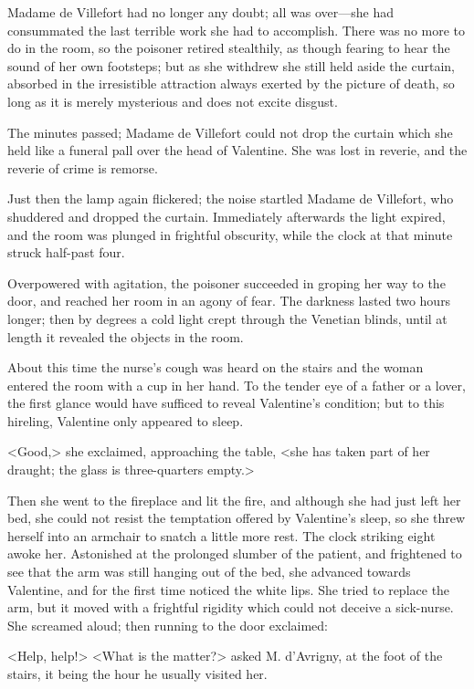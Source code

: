  Madame de Villefort had no longer any doubt; all was over—she had consummated the last terrible work she had to accomplish. There was no more to do in the room, so the poisoner retired stealthily, as though fearing to hear the sound of her own footsteps; but as she withdrew she still held aside the curtain, absorbed in the irresistible attraction always exerted by the picture of death, so long as it is merely mysterious and does not excite disgust. 

 The minutes passed; Madame de Villefort could not drop the curtain which she held like a funeral pall over the head of Valentine. She was lost in reverie, and the reverie of crime is remorse. 

 Just then the lamp again flickered; the noise startled Madame de Villefort, who shuddered and dropped the curtain. Immediately afterwards the light expired, and the room was plunged in frightful obscurity, while the clock at that minute struck half-past four. 

 Overpowered with agitation, the poisoner succeeded in groping her way to the door, and reached her room in an agony of fear. The darkness lasted two hours longer; then by degrees a cold light crept through the Venetian blinds, until at length it revealed the objects in the room. 

 About this time the nurse's cough was heard on the stairs and the woman entered the room with a cup in her hand. To the tender eye of a father or a lover, the first glance would have sufficed to reveal Valentine's condition; but to this hireling, Valentine only appeared to sleep. 

 <Good,> she exclaimed, approaching the table, <she has taken part of her draught; the glass is three-quarters empty.> 

 Then she went to the fireplace and lit the fire, and although she had just left her bed, she could not resist the temptation offered by Valentine's sleep, so she threw herself into an armchair to snatch a little more rest. The clock striking eight awoke her. Astonished at the prolonged slumber of the patient, and frightened to see that the arm was still hanging out of the bed, she advanced towards Valentine, and for the first time noticed the white lips. She tried to replace the arm, but it moved with a frightful rigidity which could not deceive a sick-nurse. She screamed aloud; then running to the door exclaimed: 

 <Help, help!>  <What is the matter?> asked M. d'Avrigny, at the foot of the stairs, it being the hour he usually visited her. 


